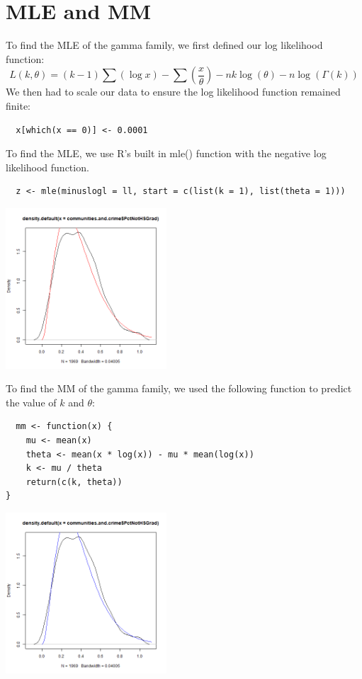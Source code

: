 \documentclass[12pt, letterpaper]{report}
\begin{document}
\section{MLE and MM}
To find the MLE of the gamma family, we first defined our log likelihood function:
\begin{equation}
  L(k, \theta) = (k-1)\sum(\log{x}) - \sum(\frac{x}{\theta}) - n k \log{(\theta)} - n \log{(\Gamma(k))}
\end{equation}
We then had to scale our data to ensure the log likelihood function remained finite: 
\begin{lstlisting}
  x[which(x == 0)] <- 0.0001  
\end{lstlisting} 
To find the MLE, we use R's built in mle() function with the negative log likelihood function. 
\begin{lstlisting}
  z <- mle(minuslogl = ll, start = c(list(k = 1), list(theta = 1)))
\end{lstlisting} 

\begin{center}
\includegraphics[width=0.45\textwidth]{gamma/PctNotHsGrad_mle}
\end{center}

To find the MM of the gamma family, we used the following function to predict the value of $k$ and $\theta$:
\begin{lstlisting}
  mm <- function(x) {
    mu <- mean(x)
    theta <- mean(x * log(x)) - mu * mean(log(x))
    k <- mu / theta
    return(c(k, theta))
}
\end{lstlisting}

\begin{center}
\includegraphics[width=0.45\textwidth]{gamma/PctNotHsGrad_mm}
\end{center}
\end{document}
